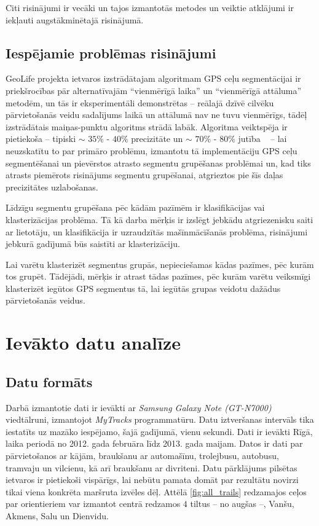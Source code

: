 \documentclass{ludis}
\begin{document}
Citi risinājumi ir vecāki un tajos izmantotās metodes un veiktie atklājumi ir iekļauti
augstākminētajā risinājumā.

\section{Iespējamie problēmas risinājumi}
GeoLife projekta ietvaros izstrādātajam algoritmam GPS ceļu segmentācijai ir priekšrocības 
pār alternatīvajām ``vienmērīgā laika'' un ``vienmērīgā attāluma'' metodēm, un tās ir
eksperimentāli demonstrētas -- reālajā dzīvē cilvēku pārvietošanās veidu sadalījums laikā 
un attālumā nav ne tuvu vienmērīgs, tādēļ izstrādātais maiņas-punktu algoritms strādā labāk.
Algoritma veiktspēja ir pietiekoša -- tipiski $\sim$ $35\%$ - $40\%$
precizitāte un $\sim$ $70\%$ - $80\%$ jutība ~\cite{zheng_gps_segmentation} -- 
lai neuzskatītu to par primāro problēmu, izmantotu tā implementāciju GPS ceļu segmentēšanai 
un pievērstos atrasto segmentu grupēšanas problēmai un, kad tiks atrasts piemērots risinājums
segmentu grupēšanai, atgrieztos pie šīs daļas precizitātes uzlabošanas.

Līdzīgu segmentu grupēšana pēc kādām pazīmēm ir klasifikācijas vai klasterizācijas problēma. Tā kā
darba mērķis ir izslēgt jebkādu atgriezenisku saiti ar lietotāju, un klasifikācija ir uzraudzītās
mašīnmācīšanās problēma, risinājumi jebkurā gadījumā būs saistīti ar klasterizāciju.

Lai varētu klasterizēt segmentus grupās, nepieciešamas kādas pazīmes, pēc kurām tos grupēt. Tādējādi,
mērķis ir atrast tādas pazīmes, pēc kurām varētu veiksmīgi klasterizēt iegūtos GPS segmentus tā,
lai iegūtās grupas veidotu dažādus pārvietošanās veidus.

\chapter{Ievākto datu analīze}
\section{Datu formāts}
Darbā izmantotie dati ir ievākti ar \emph{Samsung Galaxy Note (GT-N7000)} viedtālruni, izmantojot
\emph{MyTracks} programmatūru. Datu iztveršanas intervāls tika iestatīts uz mazāko iespējamo,
šajā gadījumā, vienu sekundi. Dati ir ievākti Rīgā, laika periodā no 2012. gada februāra līdz 
2013. gada maijam. Datos ir dati par pārvietošanos ar kājām, braukšanu ar automašīnu, trolejbusu,
autobusu, tramvaju un vilcienu, kā arī braukšanu ar divriteni. Datu pārklājums pilsētas ietvaros 
ir pietiekoši vispārīgs, lai nebūtu pamata domāt par rezultātu novirzi tikai viena konkrēta 
maršruta izvēles dēļ. Attēlā \ref{fig:all_trails} redzamajos ceļos par orientieriem var izmantot
centrā redzamos $4$ tiltus -- no augšas --, Vanšu, Akmens, Salu un Dienvidu.
\end{document}
